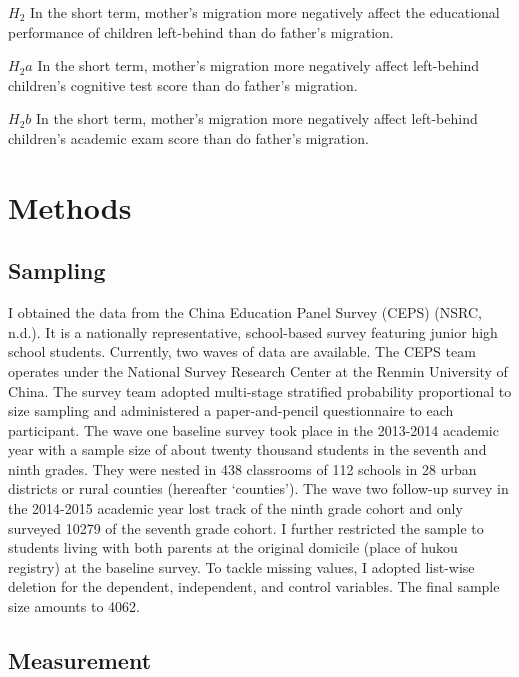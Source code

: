\documentclass[
  man,floatsintext]{apa7}
\begin{document}
\(H_2\) In the short term, mother's migration more negatively affect the educational performance of children left-behind than do father's migration.

\(H_2a\) In the short term, mother's migration more negatively affect left-behind children's cognitive test score than do father's migration.

\(H_2b\) In the short term, mother's migration more negatively affect left-behind children's academic exam score than do father's migration.

\newpage

\hypertarget{methods}{%
\section{Methods}\label{methods}}

\hypertarget{sampling}{%
\subsection{Sampling}\label{sampling}}

I obtained the data from the China Education Panel Survey (CEPS) (NSRC, n.d.). It is a nationally representative, school-based survey featuring junior high school students. Currently, two waves of data are available. The CEPS team operates under the National Survey Research Center at the Renmin University of China. The survey team adopted multi-stage stratified probability proportional to size sampling and administered a paper-and-pencil questionnaire to each participant. The wave one baseline survey took place in the 2013-2014 academic year with a sample size of about twenty thousand students in the seventh and ninth grades. They were nested in 438 classrooms of 112 schools in 28 urban districts or rural counties (hereafter `counties'). The wave two follow-up survey in the 2014-2015 academic year lost track of the ninth grade cohort and only surveyed 10279 of the seventh grade cohort. I further restricted the sample to students living with both parents at the original domicile (place of hukou registry) at the baseline survey. To tackle missing values, I adopted list-wise deletion for the dependent, independent, and control variables. The final sample size amounts to 4062.

\hypertarget{measurement}{%
\subsection{Measurement}\label{measurement}}
\end{document}
